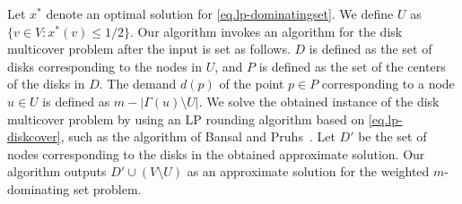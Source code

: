 \documentclass[11pt]{article}
\begin{document}
Let $x^*$ denote an optimal solution for \eqref{eq.lp-dominatingset}.
We define $U$ as $\{v \in V \colon x^*(v)\leq 1/2 \}$.
Our algorithm invokes
an algorithm for the disk multicover problem after the input is set as follows.
$D$ is defined as
the set of disks corresponding to the nodes in $U$,
and $P$ is defined as the set of the centers of the disks in $D$.
The demand $d(p)$ of the point $p \in P$
corresponding to a node $u \in U$
is defined as $m - |\Gamma(u) \setminus U|$.
We solve the obtained instance of the disk multicover problem
by using an LP rounding algorithm based on \eqref{eq.lp-diskcover}, such as
the algorithm of Bansal and Pruhs~\cite{Bansal:2012ik}.
Let $D'$ be the set of nodes corresponding to the disks in the obtained approximate solution.
Our algorithm outputs $D' \cup (V \setminus U)$ as an approximate
solution for the weighted $m$-dominating set problem.
\end{document}
